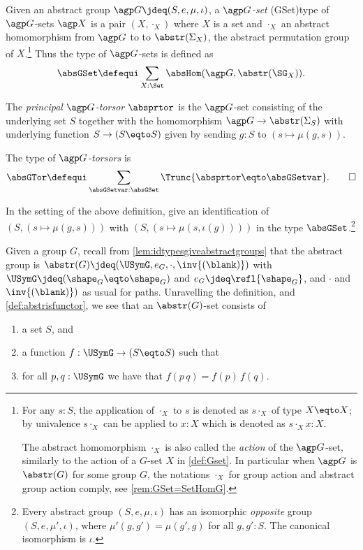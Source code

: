 \begin{definition}
\label{def:abstrGtorsors}
Given an abstract group ${\agp G}\jdeq(S,e,\mu,\iota)$, a \emph{$\agp G$-set}%
\glossary(GSet){\protect{$\absGSet$}}{type of $\agp G$-sets}
$\agp X$ is a pair $(X,\cdot_X)$ where $X$ is a set and $\cdot_X$
an abstract homomorphism from $\agp G$ to 
to $\abstr(\Sigma_X)$, the abstract permutation group of $X$.\footnote{%
For any $s:S$, the application of $\cdot_X$ to $s$ is denoted as $s\cdot_X$
of type $X\eqto X$; by univalence $s\cdot_X$ can be applied
to $x:X$ which is denoted as $s\cdot_X x : X$.
 
The abstract homomorphism $\cdot_X$ is also called the \emph{action} of the
$\agp G$-set, similarly to the action of a $G$-set $X$ in \cref{def:Gset}.
In particular when $\agp G$ is $\abstr(G)$ for some group $G$,
the notations $\cdot_X$ for group action and abstract group action comply,
see \cref{rem:GSet=SetHomG}.}
Thus the type of $\agp G$-sets is defined as
\[
  \absGSet\defequi \sum_{X:\Set}\absHom({\agp G},\abstr(\SG_X)).
\]

The \emph{principal ${\agp G}$-torsor} $\absprtor$ is the
${\agp G}$-set consisting of the underlying set $S$ together with
the homomorphism ${\agp G}\to\abstr(\Sigma_{S})$ with underlying
function $S\to (S\eqto S)$ given by sending $g:S$ to $(s\mapsto \mu(g,s))$.

The type of \emph{${\agp G}$-torsors} is
\[
  \absGTor\defequi\sum_{\absGSetvar:\absGSet}
  \Trunc{\absprtor \eqto \absGSetvar}.\qedhere
\]
\end{definition}

\begin{xca}\label{xca:absprtorsor}
In the setting of the above definition,
give an identification of $(S,(s\mapsto \mu(g,s)))$ with
$(S,(s\mapsto \mu(s,\iota(g))))$
in the type $\absGSet$.\footnote{Every abstract group $(S,e,\mu,\iota)$
has an isomorphic \emph{opposite} group $(S,e,\mu',\iota)$, where
$\mu'(g,g')=\mu(g',g)$ for all $g,g':S$. 
The canonical isomorphism is $\iota$.}
\end{xca}

\begin{example}
  Given a group $G$, recall from \cref{lem:idtypesgiveabstractgroups}
  that the abstract group is 
  $\abstr(G)\jdeq(\USymG,e_G,\cdot,\inv{(\blank)})$ 
  with $\USymG\jdeq(\sh_G\eqto\sh_G)$ and $e_G\jdeq\refl{\sh_G}$,
  and $\cdot$ and $\inv{(\blank)})$ as usual for paths.
  Unravelling the definition, and \cref{def:abstrisfunctor},
  we see that an $\abstr(G)$-set consists of
  \begin{enumerate}
  \item a set $S$, and
  \item a function $f:\USymG\to (S\eqto S)$ such that
  \item for all $p,q:\USymG$ we have that $f(p\, q)=f(p)\,f(q)$.\qedhere
  \end{enumerate}
\end{example}

